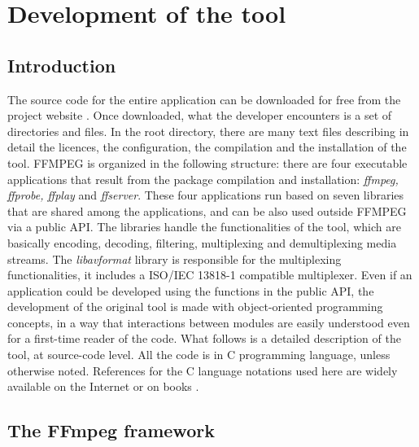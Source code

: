\documentclass[
	12pt,				%
	openright,			%
	twoside,			%
	a4paper,			%
	brazil,
	french,				%
	english
	]{abntex2}
\begin{document}
\chapter{Development of the tool}

\section{Introduction}

The source code for the entire application can be downloaded for free from the project website \cite{ffmpeg}. Once downloaded, what the developer encounters is a set of directories and files. In the root directory, there are many text files describing in detail the licences, the configuration, the compilation and the installation of the tool. FFMPEG is organized in the following structure: there are four executable applications that result from the package compilation and installation: \textit{ffmpeg, ffprobe, ffplay} and \textit{ffserver}. These four applications run based on seven libraries that are shared among the applications, and can be also used outside FFMPEG via a public API. The libraries handle the functionalities of the tool, which are basically encoding, decoding, filtering, multiplexing and demultiplexing media streams. The \textit{libavformat} library is responsible for the multiplexing functionalities, it includes a ISO/IEC 13818-1 compatible multiplexer. Even if an application could be developed using the functions in the public API, the development of the original tool is made with object-oriented programming concepts, in a way that interactions between modules are easily understood even for a first-time reader of the code. What follows is a detailed description of the tool, at source-code level. All the code is in C programming language, unless otherwise noted. References for the C language notations used here are widely available on the Internet \cite{cpp_reference} or on books \cite{ritchie}.

\section{The FFmpeg framework}

\end{document}
